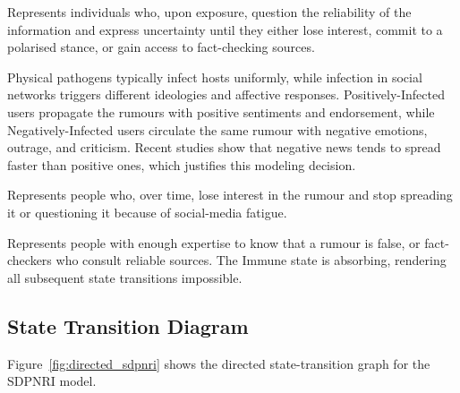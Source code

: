 \documentclass[11pt]{article}
\begin{document}
\begin{description}[leftmargin=2.2cm, style=nextline]
    \item[Doubtful] Represents individuals who, upon exposure, question the reliability
    of the information and express uncertainty until they either lose interest, commit
    to a polarised stance, or gain access to fact-checking sources.

    \item[Infection (P/N)] Physical pathogens typically infect hosts uniformly, while
    infection in social networks triggers different ideologies and affective
    responses. Positively-Infected users propagate the rumours with positive
    sentiments and endorsement, while Negatively-Infected users circulate the same
    rumour with negative emotions, outrage, and criticism. Recent studies show that
    negative news tends to spread faster than positive ones, which justifies this
    modeling decision.

    \item[Restrained] Represents people who, over time, lose interest in the rumour and
    stop spreading it or questioning it because of social-media fatigue.

    \item[Immune] Represents people with enough expertise to know that a rumour is
    false, or fact-checkers who consult reliable sources. The Immune state is
    absorbing, rendering all subsequent state transitions impossible.
\end{description}

\subsection{State Transition Diagram}

Figure~\ref{fig:directed_sdpnri} shows the directed state-transition graph for the
SDPNRI model.
\end{document}
